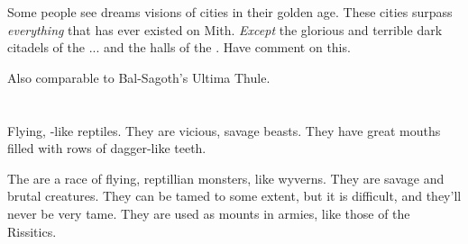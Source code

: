 Some people see dreams visions of \voyager{} cities in their golden age. These cities surpass \emph{everything} that has ever existed on Mith. \emph{Except} the glorious and terrible dark citadels of the \hs\xss... and the halls of the . Have \Ishnaruchaefir{} comment on this. 


Also comparable to Bal-Sagoth's Ultima Thule. 





















\section{\Vreiiden}
\label{\Vreiiden}
\label{\vreiiden}
Flying, \dragon-like reptiles. They are vicious, savage beasts. They have great mouths filled with rows of dagger-like teeth. 

\label{Wyverns}
\label{Vreiid}
\label{Vraiid}
The \vreiids{} are a race of flying, reptillian monsters, like wyverns. They are savage and brutal creatures. They can be tamed to some extent, but it is difficult, and they'll never be very tame. They are used as mounts in  armies, like those of the Rissitics. 
















